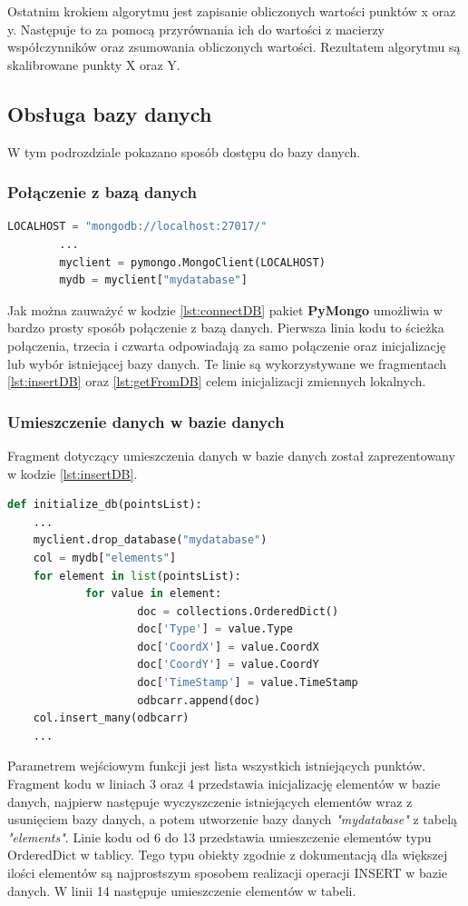 Ostatnim krokiem algorytmu jest zapisanie obliczonych wartości punktów x oraz y. Następuje to za pomocą przyrównania ich do wartości z macierzy współczynników oraz zsumowania obliczonych wartości. Rezultatem algorytmu są skalibrowane punkty X oraz Y.
\subsection{Obsługa bazy danych}
W tym podrozdziale pokazano sposób dostępu do bazy danych.
\label{ssec:db}
\subsubsection{Połączenie z bazą danych}
\begin{lstlisting}[language=Python, caption=Połączenie z bazą danych, label={lst:connectDB}]
        LOCALHOST = "mongodb://localhost:27017/"
        ...
        myclient = pymongo.MongoClient(LOCALHOST)
        mydb = myclient["mydatabase"]
\end{lstlisting}
Jak można zauważyć w kodzie \ref{lst:connectDB} pakiet \textbf{PyMongo} umożliwia w bardzo prosty sposób połączenie z bazą danych. Pierwsza linia kodu to ścieżka połączenia, trzecia i czwarta odpowiadają za samo połączenie oraz inicjalizację lub wybór istniejącej bazy danych. Te linie są wykorzystywane we fragmentach \ref{lst:insertDB} oraz \ref{lst:getFromDB} celem inicjalizacji zmiennych lokalnych.
\subsubsection{Umieszczenie danych w bazie danych}
\label{ssec:insertDB}
Fragment dotyczący umieszczenia danych w bazie danych został zaprezentowany w kodzie \ref{lst:insertDB}. 
\begin{lstlisting}[language=Python, caption=Umieszczenie danych w bazie danych, label={lst:insertDB}]
def initialize_db(pointsList):
    ...
    myclient.drop_database("mydatabase")
    col = mydb["elements"]
    for element in list(pointsList):
            for value in element:
                    doc = collections.OrderedDict()
                    doc['Type'] = value.Type
                    doc['CoordX'] = value.CoordX
                    doc['CoordY'] = value.CoordY
                    doc['TimeStamp'] = value.TimeStamp
                    odbcarr.append(doc)
    col.insert_many(odbcarr)
    ...
\end{lstlisting}
Parametrem wejściowym funkcji jest lista wszystkich istniejących punktów. Fragment kodu w liniach 3 oraz 4 przedstawia inicjalizację elementów w bazie danych, najpierw następuje wyczyszczenie istniejących elementów wraz z usunięciem bazy danych, a potem utworzenie bazy danych \emph{"mydatabase"} z tabelą \emph{"elements"}. Linie kodu od 6 do 13 przedstawia umieszczenie elementów typu OrderedDict w tablicy. Tego typu obiekty zgodnie z dokumentacją dla większej ilości elementów są najprostszym sposobem realizacji operacji INSERT w bazie danych. W linii 14 następuje umieszczenie elementów w tabeli.
